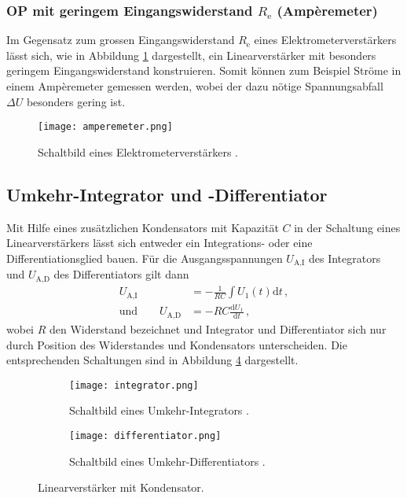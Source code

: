 \documentclass[
  bibliography=totoc,     %
  captions=tableheading,  %
  titlepage=firstiscover, %
]{scrartcl}
\begin{document}
\subsubsection{OP mit geringem Eingangswiderstand $R_\text{e}$ (Ampèremeter)}
\label{subsubsec:amperemeter}
Im Gegensatz zum grossen Eingangswiderstand $R_\text{e}$ eines
Elektrometerverstärkers lässt sich, wie in Abbildung
\ref{fig:amperemeter} dargestellt, ein Linearverstärker mit
besonders geringem Eingangswiderstand konstruieren.
Somit können zum Beispiel Ströme in einem Ampèremeter gemessen werden, wobei
der dazu nötige Spannungsabfall $\Delta U$ besonders gering ist.
\begin{figure}
    \centering
    \texttt{[image: amperemeter.png]}
    \caption{Schaltbild eines Elektrometerverstärkers \cite{V51}.}
    \label{fig:amperemeter}
\end{figure}

\subsection{Umkehr-Integrator und -Differentiator}
\label{subsec:integrator}
Mit Hilfe eines zusätzlichen Kondensators mit Kapazität $C$ in der Schaltung
eines Linearverstärkers lässt sich entweder ein Integrations- oder eine
Differentiationsglied bauen.
Für die Ausgangsspannungen $U_\text{A,I}$ des Integrators und $U_\text{A,D}$
des Differentiators gilt dann
\begin{align*}
    U_\text{A,I} &= - \frac{1}{RC} \int U_1\!(t) \mathup{d}t\,,\\
    \text{und} \qquad U_\text{A,D} &= - RC \frac{\mathup{d}U_1}{\mathup{d}t}\,,
\end{align*}
wobei $R$ den Widerstand bezeichnet und Integrator und Differentiator sich
nur durch Position des Widerstandes und Kondensators unterscheiden.
Die entsprechenden Schaltungen sind in Abbildung \ref{fig:integrator}
dargestellt.
\begin{figure}
    \begin{subfigure}{.49\linewidth}
        \centering
        \texttt{[image: integrator.png]}
        \caption{Schaltbild eines Umkehr-Integrators \cite{V51}.}
        \label{fig:integrator-integrator}
    \end{subfigure}
    \begin{subfigure}{.49\linewidth}
        \centering
        \texttt{[image: differentiator.png]}
        \caption{Schaltbild eines Umkehr-Differentiators \cite{V51}.}
        \label{fig:integrator-differentiator}
    \end{subfigure}
    \caption{Linearverstärker mit Kondensator.}
    \label{fig:integrator}
\end{figure}
\end{document}
